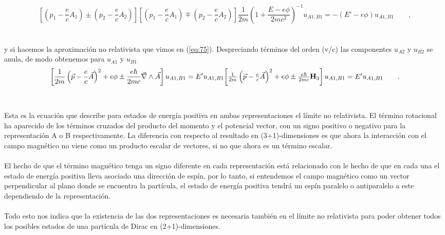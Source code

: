 \documentclass[11pt,letterpaper]{article}     %
\begin{document}
\begin{equation}\label{eq:135}
\left[\left(p_1 - \frac{e}{c}A_1\right) \pm \left(p_2 - \frac{e}{c}A_2\right)\right] \left[\left(p_1 - \frac{e}{c}A_1\right) \mp \left(p_2 - \frac{e}{c}A_2\right)\right]\frac{1}{2m} \left(1 + \frac{E-e\phi}{2mc^2}\right)^{-1}u_{A1,B1}=-(E'-e\phi)u_{A1,B1} \qquad , 
\end{equation} \\ \\
y si hacemos la aproximación no relativista que vimos en (\ref{eq:75}). Despreciando términos del orden (v/c) las componentes $u_{A2}$ y $u_{B2}$ se anula, de modo obtenemos para $u_{A1}$ y $u_{B1}$
\begin{equation}\label{eq:136}
\left[\frac{1}{2m}\left(\vec{p} - \frac{e}{c}\vec{A}\right)^2 + e\phi \pm \frac{e \hbar}{2mc} \vec{\nabla} \wedge \vec{A}\right]u_{A1,B1}=E' u_{A1,B1} $$\\$$
\left[\frac{1}{2m}\left(\vec{p} - \frac{e}{c}\vec{A}\right)^2 + e\phi \pm \frac{e \hbar}{2mc} \textbf{H}_3 \right]u_{A1,B1}=E' u_{A1,B1} \qquad .
\end{equation} \\ \\
Esta es la ecuación que describe para estados de energía positiva en ambas representaciones el límite no relativista. El término rotacional ha aparecido de los términos cruzados del producto del momento y el potencial vector, con un signo positivo o negativo para la representación A o B respectivamente. La diferencia con respecto al resultado en (3+1)-dimensiones es que ahora la interacción con el campo magnético no viene como un producto escalar de vectores, si no que ahora es un término escalar.  \\ \\
El hecho de que el término magnético tenga un signo diferente en cada representación está relacionado con le hecho de que en cada una el estado de energía positiva lleva asociado una dirección de espín, por lo tanto, si entendemos el campo magnético como un vector perpendicular al plano donde se encuentra la partícula, el estado de energía positiva tendrá un espín paralelo o antiparalelo a este dependiendo de la representación. \\ \\
Todo esto nos indica que la existencia de las dos representaciones es necesaria también en el límite no relativista para poder obtener todos los posibles estados de una partícula de Dirac en (2+1)-dimensiones.
\end{document}
